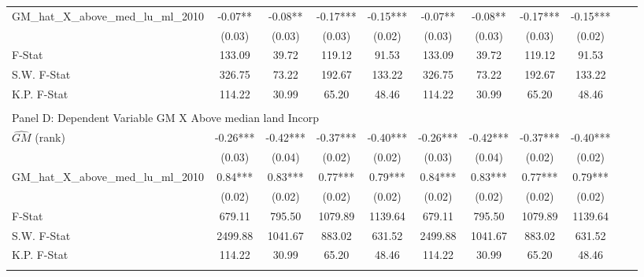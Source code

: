 \begin{table}[htbp]
\begin{threeparttable}
\begin{tabular}{l*{10}{c}}
\addlinespace
GM\_hat\_X\_above\_med\_lu\_ml\_2010&      -0.07** &      -0.08** &      -0.17***&      -0.15***&      -0.07** &      -0.08** &      -0.17***&      -0.15***\\
                &     (0.03)   &     (0.03)   &     (0.03)   &     (0.02)   &     (0.03)   &     (0.03)   &     (0.03)   &     (0.02)   \\
\midrule
F-Stat          &     133.09   &      39.72   &     119.12   &      91.53   &     133.09   &      39.72   &     119.12   &      91.53   \\
S.W. F-Stat     &     326.75   &      73.22   &     192.67   &     133.22   &     326.75   &      73.22   &     192.67   &     133.22   \\
K.P. F-Stat     &     114.22   &      30.99   &      65.20   &      48.46   &     114.22   &      30.99   &      65.20   &      48.46   \\
\cmidrule[\heavyrulewidth](lr){1-9} \\ \cmidrule[\heavyrulewidth](lr){1-9}
\multicolumn{8}{l}{Panel D: Dependent Variable GM X Above median land Incorp}\\
\cmidrule(lr){1-9}
$\hat{GM}$ (rank)&      -0.26***&      -0.42***&      -0.37***&      -0.40***&      -0.26***&      -0.42***&      -0.37***&      -0.40***\\
                &     (0.03)   &     (0.04)   &     (0.02)   &     (0.02)   &     (0.03)   &     (0.04)   &     (0.02)   &     (0.02)   \\
\addlinespace
GM\_hat\_X\_above\_med\_lu\_ml\_2010&       0.84***&       0.83***&       0.77***&       0.79***&       0.84***&       0.83***&       0.77***&       0.79***\\
                &     (0.02)   &     (0.02)   &     (0.02)   &     (0.02)   &     (0.02)   &     (0.02)   &     (0.02)   &     (0.02)   \\
\midrule
F-Stat          &     679.11   &     795.50   &    1079.89   &    1139.64   &     679.11   &     795.50   &    1079.89   &    1139.64   \\
S.W. F-Stat     &    2499.88   &    1041.67   &     883.02   &     631.52   &    2499.88   &    1041.67   &     883.02   &     631.52   \\
K.P. F-Stat     &     114.22   &      30.99   &      65.20   &      48.46   &     114.22   &      30.99   &      65.20   &      48.46   \\
\cmidrule[\heavyrulewidth](lr){1-9} \\ \cmidrule[\heavyrulewidth](lr){1-9}

\end{tabular}
\end{threeparttable}
\end{table}
